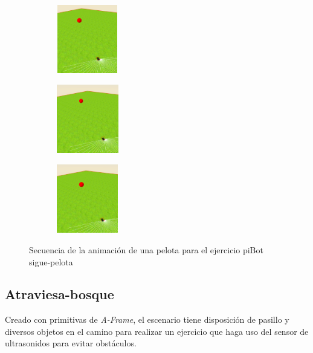 \begin{figure}[htbp]
\begin{subfigure}[t]{0.2\textwidth}
    \includegraphics[width=3cm, height=3cm]{img/BallPibot7.png}
\label{fig:figure1_7}
\end{subfigure}\hfill
\begin{subfigure}[t]{0.2\textwidth}
    \includegraphics[width=3cm, height=3cm]{img/BallPibot8.png}
\label{fig:figure1_8}
\end{subfigure}\hfill
\begin{subfigure}[t]{0.2\textwidth}
    \includegraphics[width=3cm, height=3cm]{img/BallPibot9.png}
\label{fig:figure1_9}
\end{subfigure}
\caption{Secuencia de la animación de una pelota para el ejercicio piBot sigue-pelota}
\label{fig:secuenciaPibot}
\end{figure}

\subsection{Atraviesa-bosque}
\label{subsec:atraviesabosque}

Creado con primitivas de \textit{A-Frame}, el escenario tiene disposición de pasillo y diversos objetos en el camino para realizar un ejercicio que haga uso del sensor de ultrasonidos para evitar obstáculos.

